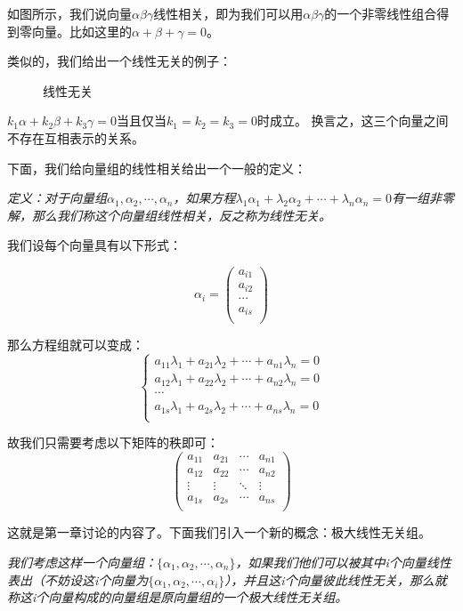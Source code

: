 \documentclass[a4paper]{ctexart}
\begin{document}
如图所示，我们说向量$\alpha \beta \gamma$线性相关，即为我们可以用$\alpha \beta \gamma$的一个非零线性组合得到零向量。比如这里的$\alpha+\beta+\gamma=0$。

类似的，我们给出一个线性无关的例子：

\begin{figure}[htp]
\centering
{}
\caption{线性无关}
\end{figure}

$k_1\alpha+k_2\beta+k_3\gamma=0$当且仅当$k_1=k_2=k_3=0$时成立。
换言之，这三个向量之间不存在互相表示的关系。

下面，我们给向量组的线性相关给出一个一般的定义：

\textit{定义：对于向量组$\alpha_1,\alpha_2,\cdots,\alpha_n$，如果方程$\lambda_1\alpha_1+\lambda_2\alpha_2+\cdots+\lambda_n\alpha_n=0$有一组非零解，那么我们称这个向量组线性相关，反之称为线性无关。}

我们设每个向量具有以下形式：

$$
\alpha_i=
\left(
\begin{array}{cccc}
a_{i1}\\
a_{i2}\\
\cdots \\
a_{is}\\
\end{array}
\right )
$$

那么方程组就可以变成：
$$
\begin{cases}
a_{11}\lambda_{1}+a_{21}\lambda_{2}+\cdots+a_{n1}\lambda_{n}=0\\
a_{12}\lambda_{1}+a_{22}\lambda_{2}+\cdots+a_{n2}\lambda_{n}=0\\
\cdots\\
a_{1s}\lambda_{1}+a_{2s}\lambda_{2}+\cdots+a_{ns}\lambda_{n}=0\\
\end{cases}
$$

故我们只需要考虑以下矩阵的秩即可：
$$
\begin{pmatrix}
a_{11}&a_{21}&\cdots&a_{n1}\\
a_{12}&a_{22}&\cdots&a_{n2}\\
\vdots&\vdots&\ddots&\vdots\\
a_{1s}&a_{2s}&\cdots&a_{ns}\\
\end{pmatrix}
$$

这就是第一章讨论的内容了。下面我们引入一个新的概念：极大线性无关组。

\textit{我们考虑这样一个向量组：$\{\alpha_1,\alpha_2,\cdots,\alpha_n\}$，如果我们他们可以被其中i个向量线性表出（不妨设这i个向量为$\{\alpha_1,\alpha_2,\cdots,\alpha_i\}$），并且这i个向量彼此线性无关，那么就称这i个向量构成的向量组是原向量组的一个极大线性无关组。}
\end{document}

